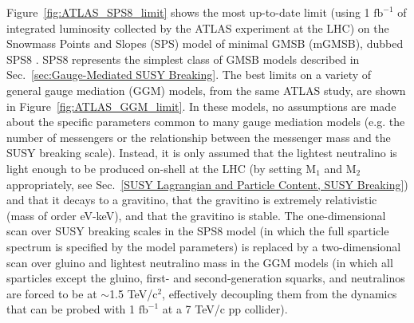\documentclass[dissertation.tex]{subfiles}
\begin{document}
Figure~\ref{fig:ATLAS_SPS8_limit} shows the most up-to-date limit (using 1 $\mbox{fb}^{-1}$ of integrated luminosity collected by the ATLAS experiment \cite{ATLAS} at the LHC) on the Snowmass Points and Slopes (SPS) model of minimal GMSB (mGMSB), dubbed SPS8 \cite{SPS}.  SPS8 represents the simplest class of GMSB models described in Sec.~\ref{sec:Gauge-Mediated SUSY Breaking}.  The best limits on a variety of general gauge mediation (GGM) models, from the same ATLAS study, are shown in Figure~\ref{fig:ATLAS_GGM_limit}.  In these models, no assumptions are made about the specific parameters common to many gauge mediation models (e.g. the number of messengers or the relationship between the messenger mass and the SUSY breaking scale).  Instead, it is only assumed that the lightest neutralino is light enough to be produced on-shell at the LHC (by setting $\mbox{M}_{1}$ and $\mbox{M}_{2}$ appropriately, see Sec.~\ref{SUSY Lagrangian and Particle Content, SUSY Breaking}) and that it decays to a gravitino, that the gravitino is extremely relativistic (mass of order eV-keV), and that the gravitino is stable.  The one-dimensional scan over SUSY breaking scales in the SPS8 model (in which the full sparticle spectrum is specified by the model parameters) is replaced by a two-dimensional scan over gluino and lightest neutralino mass in the GGM models (in which all sparticles except the gluino, first- and second-generation squarks, and neutralinos are forced to be at $\sim$1.5 TeV/$\mbox{c}^{2}$, effectively decoupling them from the dynamics that can be probed with 1 $\mbox{fb}^{-1}$ at a 7 TeV/c pp collider).
\end{document}
